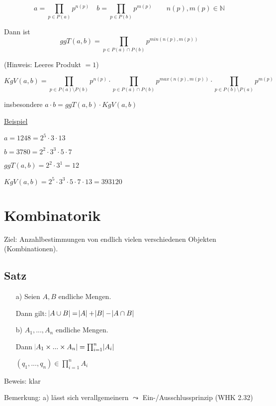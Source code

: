 \documentclass[a4paper, 12pt, twoside] {article}
\begin{document}
$$ a = \prod_{p \in P(a)} p^{n(p)} \quad b = \prod_{p \in P(b)} p^{m(p)}	\qquad n(p), m(p) \in \mathbb{N}$$

Dann ist $$ggT(a,b) = \prod_{p \in P(a) \cap P(b)} p^{min(n(p),m(p))}$$

\hfill (Hinweis: Leeres Produkt $= 1$)
	
$$KgV(a,b) = \prod_{p \in P(a) \setminus P(b)} p^{n(p)} \cdot \prod_{p \in P(a) \cap P(b)} p^{max(n(p),m(p))} \cdot \prod_{p \in P(b) \setminus P(a)} p^{m(p)}$$

insbesondere $a \cdot b = ggT(a,b) \cdot KgV(a,b)$

\underline{Beispiel}

$a = 1248 = 2^5 \cdot 3 \cdot 13$

$b = 3780 = 2^2 \cdot 3^3 \cdot 5 \cdot 7$

$ggT(a,b) = 2^2 \cdot 3^1 = 12$

$KgV(a,b) = 2^5 \cdot 3^3 \cdot 5 \cdot 7 \cdot 13 = 393 120$

\section{Kombinatorik} %

Ziel: Anzahlbestimmungen von endlich vielen verschiedenen Objekten (Kombinationen).

\subsection{Satz} %

\begin{itemize}
\item[a)] Seien $A,B$ endliche Mengen.

Dann gilt: $\abs{A \cup B} = \abs{A} + \abs{B} - \abs{A \cap B}$

\item[b)] $A_1, ..., A_n$ endliche Mengen.

Dann $\abs{A_1 \times ... \times A_n} = \prod_{i=1}^n \abs{A_i}$

$(q_1, ..., q_n) \in \prod_{i=1}^n A_i$

\end{itemize}

Beweis: klar


Bemerkung: a) lässt sich verallgemeinern $\leadsto$ Ein-/Ausschlussprinzip (WHK 2.32)
\end{document}
